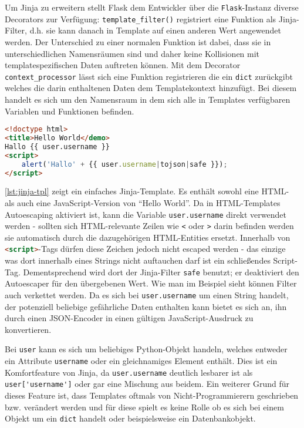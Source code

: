Um Jinja zu erweitern stellt Flask dem Entwickler über die \lstinline{Flask}-Instanz diverse
Decorators zur Verfügung: \lstinline{template_filter()} registriert eine Funktion als Jinja-Filter,
d.h. sie kann danach in Template auf einen anderen Wert angewendet werden. Der Unterschied zu einer
normalen Funktion ist dabei, dass sie in unterschiedlichen Namensräumen sind und daher keine
Kollisionen mit templatespezifischen Daten auftreten können. Mit dem Decorator
\lstinline{context_processor} lässt sich eine Funktion registrieren die ein \lstinline{dict}
zurückgibt welches die darin enthaltenen Daten dem Templatekontext hinzufügt. Bei diesem handelt es
sich um den Namensraum in dem sich alle in Templates verfügbaren Variablen und Funktionen befinden.

\begin{lstlisting}[language=HTML,caption=Jinja2-Template,label=lst:jinja-tpl]
<!doctype html>
<title>Hello World</demo>
Hallo {{ user.username }}
<script>
    alert('Hallo' + {{ user.username|tojson|safe }});
</script>
\end{lstlisting}

\autoref{lst:jinja-tpl} zeigt ein einfaches Jinja-Template. Es enthält sowohl eine HTML- als auch
eine JavaScript-Version von \enquote{Hello World}. Da in HTML-Templates Autoescaping aktiviert ist,
kann die Variable \lstinline{user.username} direkt verwendet werden - sollten sich HTML-relevante
Zeilen wie \lstinline{<} oder \lstinline{>} darin befinden werden sie automatisch durch die
dazugehörigen HTML-Entities ersetzt. Innerhalb von \lstinline[language=HTML]{<script>}-Tags dürfen
diese Zeichen jedoch nicht escaped werden - das einzige was dort innerhalb eines Strings nicht
auftauchen darf ist ein schließendes Script-Tag.  Dementsprechend wird dort der Jinja-Filter
\lstinline{safe} benutzt; er deaktiviert den Autoescaper für den übergebenen Wert. Wie man im
Beispiel sieht können Filter auch verkettet werden. Da es sich bei \lstinline{user.username} um
einen String handelt, der potenziell beliebige gefährliche Daten enthalten kann bietet es sich an,
ihn durch einen JSON-Encoder in einen gültigen JavaScript-Ausdruck zu konvertieren.

Bei \lstinline{user} kann es sich um beliebiges Python-Objekt handeln, welches entweder ein
Attribute \lstinline{username} oder ein gleichnamiges Element enthält. Dies ist ein Komfortfeature
von Jinja, da \lstinline{user.username} deutlich lesbarer ist als \lstinline{user['username']} oder
gar eine Mischung aus beidem. Ein weiterer Grund für dieses Feature ist, dass Templates oftmals von
Nicht-Programmierern geschrieben bzw. verändert werden und für diese spielt es keine Rolle ob es
sich bei einem Objekt um ein \lstinline{dict} handelt oder beispielsweise ein Datenbankobjekt.

